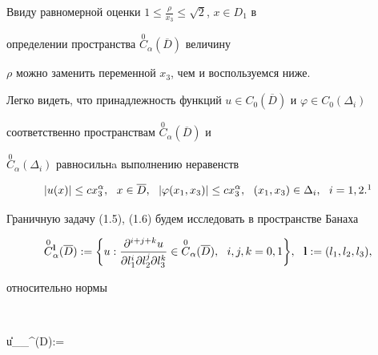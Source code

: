 \begin{note}


Ввиду равномерной оценки $1\leq \frac{\rho}{x_3}\leq \sqrt 2$, $x\in D_1$ в


определении пространства $\overset{0}{C}_{\alpha}(\overline D)$ величину


$\rho$ можно заменить переменной $x_3$, чем и воспользуемся ниже.


\end{note}





Легко видеть, что принадлежность функций $u \in C_0(\overline D)$ и $\varphi


\in C_0(\Delta_i)$


соответственно пространствам $\overset{0}{C}{}_{\alpha}(\overline D)$ и


$\overset{0}{C}{}_{\alpha}(\Delta_i)$ равносильнa выполнению неравенств




\begin{equation}


|u(x)|\leq c x_3^{\alpha},\ \ x\in \overline D,\ \ |\varphi (x_1,x_3)|


\leq c x_3^{\alpha},\ \ (x_1,x_3) \in \Delta_i,\ \ i=1,2. \footnotemark


\end{equation}







Граничную задачу (1.5), (1.6) будем исследовать в пространстве Банаха


$$


\overset{0}{C}{}_{\alpha}^{\bold{l}}(\overline D):=\bigg\{u:


\frac{\partial^{i+j+k}u}{\partial l_1^i \partial l_2^j \partial l_3^k} \in


\overset{0}{C}{}_{\alpha}(\overline D),\ \ i,j,k=0,1 \bigg\},\ \ \bold{l}


:=(l_1,l_2,l_3),


$$


относительно нормы


$$


\|u\|_{_{\alpha}^{}(\overline D)}:=


